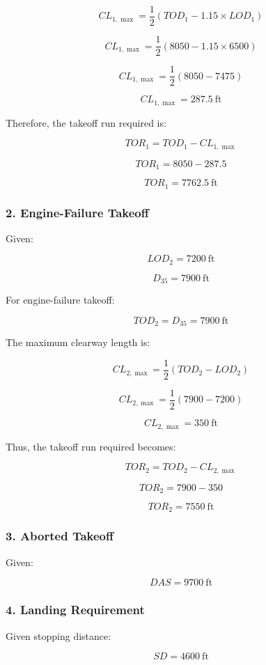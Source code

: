 \documentclass{KPS_assignment}
\begin{document}
\[
CL_{1,\max} = \frac{1}{2}\left(TOD_1 - 1.15 \times LOD_1\right)
\]

\[
CL_{1,\max}
= \frac{1}{2}\left(8050 - 1.15 \times 6500\right)
\]

\[
CL_{1,\max}
= \frac{1}{2}(8050 - 7475)
\]

\[
CL_{1,\max} = 287.5 \ \text{ft}
\]

Therefore, the takeoff run required is:

\[
TOR_1 = TOD_1 - CL_{1,\max}
\]

\[
TOR_1 = 8050 - 287.5
\]

\[
TOR_1 = 7762.5 \ \text{ft}
\]

\subsubsection*{2. Engine-Failure Takeoff}

Given:

\[
LOD_2 = 7200 \ \text{ft}
\]

\[
D_{35} = 7900 \ \text{ft}
\]

For engine-failure takeoff:

\[
TOD_2 = D_{35} = 7900 \ \text{ft}
\]

The maximum clearway length is:

\[
CL_{2,\max} = \frac{1}{2}(TOD_2 - LOD_2)
\]

\[
CL_{2,\max} = \frac{1}{2}(7900 - 7200)
\]

\[
CL_{2,\max} = 350 \ \text{ft}
\]

Thus, the takeoff run required becomes:

\[
TOR_2 = TOD_2 - CL_{2,\max}
\]

\[
TOR_2 = 7900 - 350
\]

\[
TOR_2 = 7550 \ \text{ft}
\]

\subsubsection*{3. Aborted Takeoff}

Given:

\[
DAS = 9700 \ \text{ft}
\]

\subsubsection*{4. Landing Requirement}

Given stopping distance:

\[
SD = 4600 \ \text{ft}
\]
\end{document}
